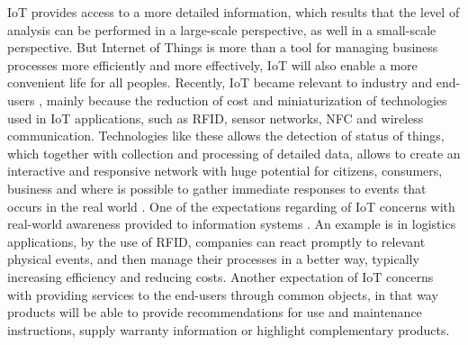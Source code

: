 IoT provides access to a more detailed information, which results that the level of analysis can be performed in a large-scale perspective, as well in a small-scale
perspective. But Internet of Things is more than a tool for managing business processes more efficiently and more effectively, IoT will also enable a more convenient life for all peoples.
Recently, IoT became relevant to industry and end-users \cite{Uckelmann:2011:AIT:2018904}, mainly because the reduction of cost and miniaturization of technologies used in IoT applications, such as RFID, sensor networks, NFC and
wireless communication. Technologies like these allows the detection of status of things, which together with collection and processing of detailed data,
allows to create an interactive and responsive network with huge potential for citizens, consumers, business and where is possible to gather immediate responses
to events that occurs in the real world \cite{Uckelmann:2011:AIT:2018904}. One of the expectations regarding of IoT concerns with real-world awareness provided to information systems \cite{mattern2010internet}.
An example is in logistics applications, by the use of RFID, companies can react promptly to relevant physical events, and then manage their processes in a better way,
typically increasing efficiency and reducing costs. Another expectation of IoT concerns with providing services to the end-users through common objects, in that
way products will be able to provide recommendations for use and maintenance instructions, supply warranty information or highlight complementary products.\\
